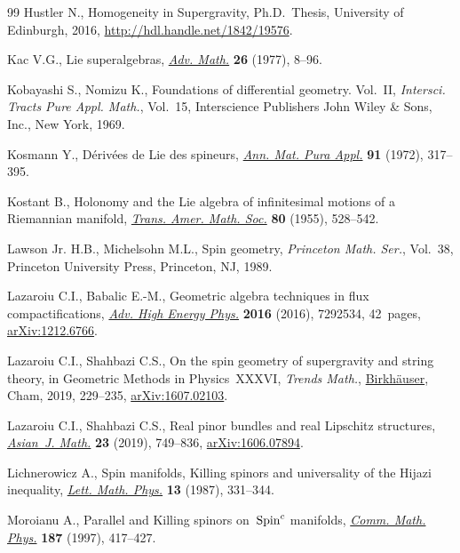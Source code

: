 \documentclass[10pt,a4paper]{amsart}
\numberwithin{equation}{section}
\newcommand{\1}{\mathbbm{1}}
\begin{document}
\begin{thebibliography}{99}
Hustler N., Homogeneity in Supergravity, Ph.D.~Thesis, {U}niversity of
 Edinburgh, 2016, \url{http://hdl.handle.net/1842/19576}.

Kac V.G., Lie superalgebras,
 \href{https://doi.org/10.1016/0001-8708(77)90017-2}{\textit{Adv. Math.}}
 \textbf{26} (1977), 8--96.

Kobayashi S., Nomizu K., Foundations of differential geometry. {V}ol.~{II},
 \textit{Intersci. Tracts Pure Appl. Math.}, Vol.~15, Interscience Publishers
 John Wiley \& Sons, Inc., New York, 1969.

Kosmann Y., D\'eriv\'ees de {L}ie des spineurs,
 \href{https://doi.org/10.1007/BF02428822}{\textit{Ann. Mat. Pura Appl.}}
 \textbf{91} (1972), 317--395.

Kostant B., Holonomy and the {L}ie algebra of infinitesimal motions of a
 {R}iemannian manifold, \href{https://doi.org/10.2307/1993001}{\textit{Trans.
 Amer. Math. Soc.}} \textbf{80} (1955), 528--542.

Lawson Jr. H.B., Michelsohn M.L., Spin geometry, \textit{Princeton Math. Ser.},
 Vol.~38, Princeton University Press, Princeton, NJ, 1989.

Lazaroiu C.I., Babalic E.-M., Geometric algebra techniques in flux
 compactifications, \href{https://doi.org/10.1155/2016/7292534}{\textit{Adv.
 High Energy Phys.}} \textbf{2016} (2016), 7292534, 42~pages,
 \href{http://arxiv.org/abs/1212.6766}{arXiv:1212.6766}.

Lazaroiu C.I., Shahbazi C.S., On the spin geometry of supergravity and string
 theory, in Geometric {M}ethods in {P}hysics~{XXXVI}, \textit{Trends Math.},
 \href{https://doi.org/10.1007/978-3-030-01156-7_25}{Birkh\"auser}, Cham,
 2019, 229--235, \href{http://arxiv.org/abs/1607.02103}{arXiv:1607.02103}.

Lazaroiu C.I., Shahbazi C.S., Real pinor bundles and real {L}ipschitz
 structures,
 \href{https://doi.org/10.4310/AJM.2019.v23.n5.a3}{\textit{Asian~J. Math.}}
 \textbf{23} (2019), 749--836,
 \href{http://arxiv.org/abs/1606.07894}{arXiv:1606.07894}.

Lichnerowicz A., Spin manifolds, {K}illing spinors and universality of the
 {H}ijazi inequality, \href{https://doi.org/10.1007/BF00401162}{\textit{Lett.
 Math. Phys.}} \textbf{13} (1987), 331--344.

Moroianu A., Parallel and {K}illing spinors on~{${\rm Spin}^c$} manifolds,
 \href{https://doi.org/10.1007/s002200050142}{\textit{Comm. Math. Phys.}}
 \textbf{187} (1997), 417--427.


\end{thebibliography}
\end{document}
